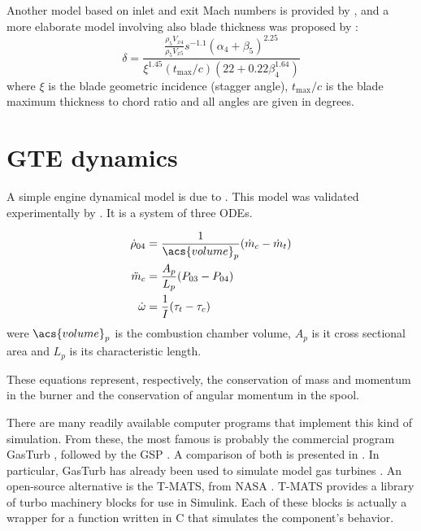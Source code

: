 Another model based on inlet and exit Mach numbers is provided by \textcite{Ainley1951}, 
and a more elaborate model involving also blade thickness was proposed by \textcite{Islam1999}:
\begin{equation}
    \delta = \frac{\frac{\rho_5 V_{x4}}{\rho_5 V_{x5}} s^{-1.1} (\alpha_4+\beta_5)^{2.25}}
                        {\xi^{1.45} \left(t_{\max}/c\right) \left(22+0.22\beta_4^{1.64}\right)}
\end{equation}
where $\xi$ is the blade geometric incidence (stagger angle), 
$t_{\max}/c$ is the blade maximum thickness to chord ratio 
and all angles are given in degrees.

\section{\Acl{GTE} dynamics}
\label{sec:review:dynamics}

A simple engine dynamical model  is due to \textcite{Fink1992}. 
This model was validated experimentally by \textcite{Gravdahl2004}.
It is a system of three \acp{ODE}.

\begin{align}
    \dot{\rho}_{04} &= \frac{1}{\acs{volume}_p}(\dot{m}_c - \dot{m}_t) \label{eqn:dyn:mass}\\
    \ddot{m}_c &= \frac{A_p}{L_p}(P_{03}-P_{04}) \label{eqn:dyn:density}\\
    \dot{\omega} &= \frac{1}{I} (\tau_t-\tau_c) \label{eqn:dyn:momentum}
\end{align}
were $\acs{volume}_p$ is the combustion chamber volume, $A_p$ is it cross sectional area and $L_p$ is its characteristic length.

These equations represent, respectively, 
the conservation of mass and momentum in the burner
and the conservation of angular momentum in the spool.

There are many readily available computer programs that implement this kind of simulation. 
From these, the most famous is probably the commercial program GasTurb \cite{GasTurb}, 
 
followed by the \gls{GSP} \cite{Visser2000}.
A comparison of both is presented in \textcite{GasTurbvsGSP}.
In particular, GasTurb has already been used to simulate model gas turbines 
\cite{gao2011modelling}.
An open-source alternative is the \gls{T-MATS}, from NASA \cite{T-MATS}.
\gls{T-MATS} provides a library of turbo machinery blocks for use in Simulink. 
Each of these blocks is actually a wrapper for a function written in C 
that simulates the component's behavior.

